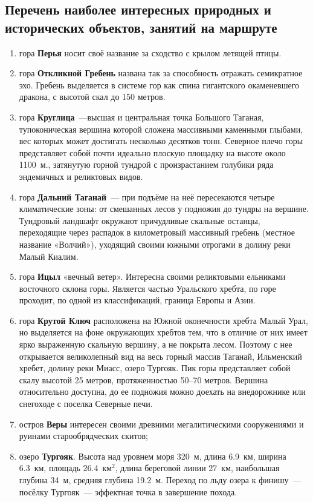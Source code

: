 \subsection{Перечень наиболее интересных природных и исторических объектов, занятий на маршруте}
\begin{enumerate}[noitemsep,topsep=0pt,parsep=0pt,partopsep=0pt]
	\item гора \textbf{Перья} носит своё название за сходство с крылом летящей птицы.
	\item гора \textbf{Откликной Гребень} названа так за способность отражать семикратное эхо.
	Гребень выделяется в системе гор как спина гигантского окаменевшего
	дракона, с высотой скал до 150 метров.
	\item гора \textbf{Круглица}~---высшая и центральная точка Большого
	Таганая, тупоконическая вершина которой сложена массивными каменными
	глыбами, вес которых может достигать несколько десятков тонн. Северное
	плечо горы представляет собой почти идеально плоскую площадку на высоте
	около 1100~м., затянутую горной тундрой с произрастанием голубики ряда
	эндемичных и реликтовых видов.
	\item гора \textbf{Дальний Таганай}~--- при подъёме на неё пересекаются четыре климатические зоны: от смешанных лесов у подножия до тундры на вершине. Тундровый ландшафт окружают причудливые скальные
	останцы, переходящие через распадок в километровый массивный гребень
	(местное название «Волчий»), уходящий своими южными отрогами в долину
	реки Малый Киалим.
	\item гора \textbf{Ицыл} «вечный ветер». Интересна своими реликтовыми ельниками восточного склона горы. Является частью Уральского хребта, по горе проходит, по одной из классификаций, граница Европы и Азии.
	\item гора \textbf{Крутой Ключ} расположена на Южной оконечности хребта Малый Урал, но выделяется на фоне окружающих хребтов тем, что в отличие
	от них имеет ярко выраженную скальную вершину, а не покрыта лесом. Поэтому с нее открывается великолепный вид на весь горный массив
	Таганай, Ильменский хребет, долину реки Миасс, озеро Тургояк. Пик горы представляет собой скалу высотой 25 метров, протяженностью 50--70 метров.
	Вершина относительно доступна, до ее подножия можно доехать на внедорожнике или снегоходе с поселка Северные печи.
	\item остров \textbf{Веры} интересен своими древними мегалитическими сооружениями и руинами старообрядческих скитов;
	\item озеро \textbf{Тургояк}. Высота над уровнем моря 320~м, длина 6.9~км,
	ширина 6.3~км, площадь 26.4~км$^2$, длина береговой линии 27~км,
	наибольшая глубина 34~м, средняя глубина 19.2~м. Переход по льду озера к финишу~--- посёлку Тургояк~--- эффектная точка в завершение похода.
\end{enumerate}

